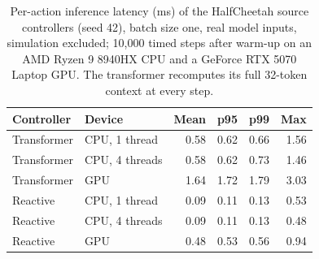 \begin{table}[t]
\caption{Per-action inference latency (ms) of the HalfCheetah source controllers (seed 42), batch size one, real model inputs, simulation excluded; 10{,}000 timed steps after warm-up on an AMD Ryzen 9 8940HX CPU and a GeForce RTX 5070 Laptop GPU. The transformer recomputes its full 32-token context at every step.}
\label{tab:latency}
\centering\small
\begin{tabular}{@{}llrrrr@{}}
\toprule
Controller & Device & Mean & p95 & p99 & Max \\
\midrule
Transformer & CPU, 1 thread & 0.58 & 0.62 & 0.66 & 1.56 \\
Transformer & CPU, 4 threads & 0.58 & 0.62 & 0.73 & 1.46 \\
Transformer & GPU & 1.64 & 1.72 & 1.79 & 3.03 \\
Reactive & CPU, 1 thread & 0.09 & 0.11 & 0.13 & 0.53 \\
Reactive & CPU, 4 threads & 0.09 & 0.11 & 0.13 & 0.48 \\
Reactive & GPU & 0.48 & 0.53 & 0.56 & 0.94 \\
\bottomrule
\end{tabular}
\end{table}
